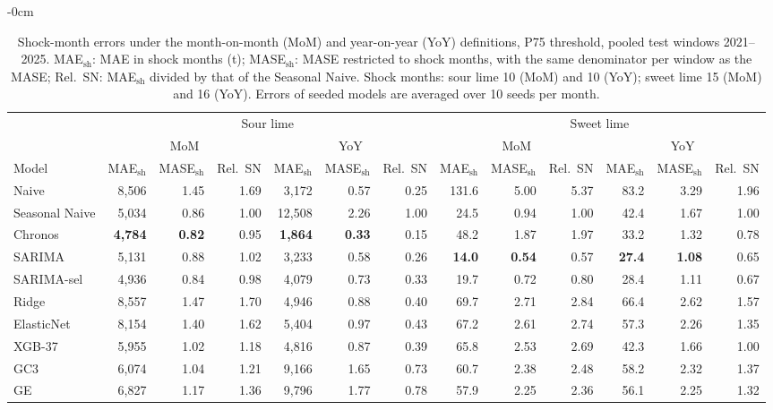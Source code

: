 
\begin{table}[htbp]
\caption{Shock-month errors under the month-on-month (MoM) and year-on-year (YoY) definitions, P75 threshold, pooled test windows 2021--2025. MAE$_{\text{sh}}$: MAE in shock months (t); MASE$_{\text{sh}}$: MASE restricted to shock months, with the same denominator per window as the MASE; Rel.~SN: MAE$_{\text{sh}}$ divided by that of the Seasonal Naive. Shock months: sour lime 10 (MoM) and 10 (YoY); sweet lime 15 (MoM) and 16 (YoY). Errors of seeded models are averaged over 10 seeds per month.\label{tab:shock_scaled}}
\begin{adjustwidth}{-\extralength}{0cm}
\centering
\scriptsize
\setlength{\tabcolsep}{3pt}
\begin{tabular}{lrrrrrrrrrrrr}
\toprule
 & \multicolumn{6}{c}{Sour lime} & \multicolumn{6}{c}{Sweet lime}\\
\cmidrule(lr){2-7}\cmidrule(lr){8-13}
 & \multicolumn{3}{c}{MoM} & \multicolumn{3}{c}{YoY} & \multicolumn{3}{c}{MoM} & \multicolumn{3}{c}{YoY}\\
\cmidrule(lr){2-4}\cmidrule(lr){5-7}\cmidrule(lr){8-10}\cmidrule(lr){11-13}
Model & MAE$_{\text{sh}}$ & MASE$_{\text{sh}}$ & Rel.~SN & MAE$_{\text{sh}}$ & MASE$_{\text{sh}}$ & Rel.~SN & MAE$_{\text{sh}}$ & MASE$_{\text{sh}}$ & Rel.~SN & MAE$_{\text{sh}}$ & MASE$_{\text{sh}}$ & Rel.~SN\\
\midrule
Naive          & 8,506 & 1.45 & 1.69 & 3,172 & 0.57 & 0.25 & 131.6 & 5.00 & 5.37 & 83.2 & 3.29 & 1.96\\
Seasonal Naive & 5,034 & 0.86 & 1.00 & 12,508 & 2.26 & 1.00 & 24.5 & 0.94 & 1.00 & 42.4 & 1.67 & 1.00\\
Chronos        & \textbf{4,784} & \textbf{0.82} & 0.95 & \textbf{1,864} & \textbf{0.33} & 0.15 & 48.2 & 1.87 & 1.97 & 33.2 & 1.32 & 0.78\\
SARIMA         & 5,131 & 0.88 & 1.02 & 3,233 & 0.58 & 0.26 & \textbf{14.0} & \textbf{0.54} & 0.57 & \textbf{27.4} & \textbf{1.08} & 0.65\\
SARIMA-sel     & 4,936 & 0.84 & 0.98 & 4,079 & 0.73 & 0.33 & 19.7 & 0.72 & 0.80 & 28.4 & 1.11 & 0.67\\
Ridge          & 8,557 & 1.47 & 1.70 & 4,946 & 0.88 & 0.40 & 69.7 & 2.71 & 2.84 & 66.4 & 2.62 & 1.57\\
ElasticNet     & 8,154 & 1.40 & 1.62 & 5,404 & 0.97 & 0.43 & 67.2 & 2.61 & 2.74 & 57.3 & 2.26 & 1.35\\
XGB-37         & 5,955 & 1.02 & 1.18 & 4,816 & 0.87 & 0.39 & 65.8 & 2.53 & 2.69 & 42.3 & 1.66 & 1.00\\
GC3            & 6,074 & 1.04 & 1.21 & 9,166 & 1.65 & 0.73 & 60.7 & 2.38 & 2.48 & 58.2 & 2.32 & 1.37\\
GE             & 6,827 & 1.17 & 1.36 & 9,796 & 1.77 & 0.78 & 57.9 & 2.25 & 2.36 & 56.1 & 2.25 & 1.32\\
\bottomrule
\end{tabular}
\end{adjustwidth}
\end{table}

